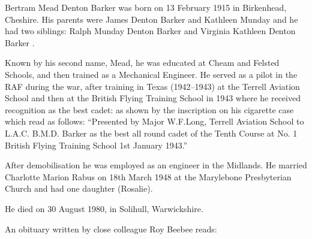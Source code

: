 
Bertram Mead Denton Barker was born on 13 February 1915 in Birkenhead, Cheshire.  His parents were James Denton Barker  and Kathleen Munday  and he had two siblings: Ralph Munday Denton Barker  and Virginia Kathleen Denton Barker .

Known by his second name, Mead, he was educated at Cheam and Felsted Schools, and then trained as a Mechanical Engineer. He served as a pilot in the RAF during the war,  after training in Texas (1942--1943) at the Terrell Aviation School and then at the British Flying Training School in 1943 where he  received recognition as the best cadet:  as shown by the inscription on his cigarette case which read as follows: ``Presented by Major W.F.Long, Terrell Aviation School to L.A.C. B.M.D. Barker as the best all round cadet of the Tenth Course at No. 1 British Flying Training School 1st January 1943.''

After demobilisation he was employed as an engineer in the Midlands. He married Charlotte Marion Rabus  on 18th March 1948 at the Marylebone Presbyterian Church \cite{TheTimes1948-03-22} and had one daughter (Rosalie).

He died on 30 August 1980, in Solihull, Warwickshire. 

An obituary written by close colleague Roy Beebee reads:


